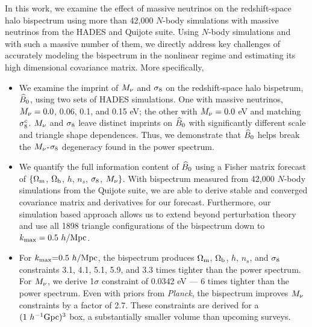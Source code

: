 In this work, we examine the effect of massive neutrinos on the redshift-space 
halo bispectrum using more than 42,000 $N$-body simulations with massive neutrinos
from the HADES and Quijote suite. Using $N$-body simulations and with such a massive 
number of them, we directly address key challenges of accurately modeling the 
bispectrum in the nonlinear regime and estimating its high dimensional covariance 
matrix. More specifically, 
\begin{itemize}
    \item We examine the imprint of $M_\nu$ and $\sigma_8$ on the redshift-space halo bispetrum, 
        $\widehat{B}_0$, using two sets of HADES simulations. One with massive neutrinos, $M_\nu = 0.0$, 0.06, 
        0.1, and 0.15 eV; the other with $M_\nu = 0.0$ eV and matching $\sigma_8^{c}$. 
        $M_\nu$ and $\sigma_8$ leave distinct imprints on $\widehat{B}_0$ with significantly different 
        scale and triangle shape dependences. Thus, we demonstrate that $\widehat{B}_0$ helps 
        break the $M_\nu$-$\sigma_8$ degeneracy found in the power spectrum. 
    \item We quantify the full information content of $\widehat{B}_0$ using a Fisher matrix forecast of 
        $\{\Omega_{\rm m}$, $\Omega_{\rm b}$, $h$, $n_s$, $\sigma_8$, $M_\nu\}$. With bispectrum measured from 42,000 
        $N$-body simulations from the Quijote suite, we are able to derive stable and converged 
        covariance matrix and derivatives for our forecast. Furthermore, our simulation 
        based approach allows us to extend beyond perturbation theory and use all 1898 
        triangle configurations of the bispectrum down to $k_{\rm max} = 0.5~h/{\rm Mpc}$.
    \item For $k_{\rm max}{=}0.5~h/{\rm Mpc}$, the bispectrum produces $\Omega_{\rm m}$, $\Omega_{\rm b}$, $h$, $n_s$, and 
        $\sigma_8$ constraints 3.1, 4.1, 5.1, 5.9, and 3.3 times tighter than the power spectrum. 
        For $M_\nu$, we derive 1$\sigma$ constraint of 0.0342 eV --- 6 times tighter than 
        the power spectrum. Even with priors from {\em Planck}, the bispectrum improves 
        $M_\nu$ constraints by a factor of 2.7. These constraints are derived for a 
        $(1~h^{-1}{\rm Gpc})^3$ box, a substantially smaller volume than upcoming surveys.
\end{itemize}

